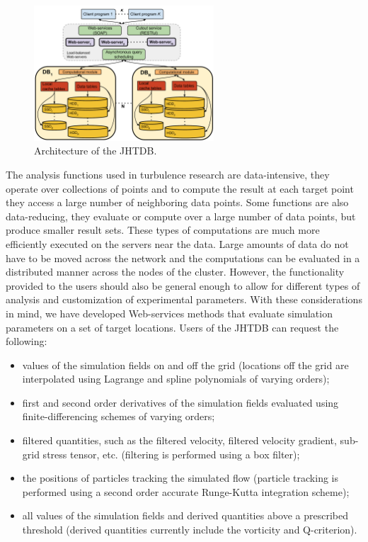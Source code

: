 \documentclass[10pt,twocolumn]{article}
\begin{document}
\begin{figure}
\includegraphics[width=0.6\textwidth]{jhtdb_diagram.pdf}
\caption{Architecture of the JHTDB.}
\label{fig:architecture}
\end{figure}

The analysis functions used in turbulence research are data-intensive, they operate over collections of points and to compute the result at each target point
they access a large number of neighboring data points. Some functions are also data-reducing, they evaluate or compute over a large number of data
points, but produce smaller result sets. These types of computations are much more efficiently executed on the servers near the data. Large amounts of data
do not have to be moved across the network and the computations can be evaluated in a distributed manner across the nodes of the cluster. However, the
functionality provided to the users should also be general enough to allow for different types of analysis and customization of experimental parameters.
With these considerations in mind, we have developed Web-services methods that evaluate simulation parameters on a set of target locations. Users of 
the JHTDB can request the following:
\begin{itemize}
\item values of the simulation fields on and off the grid (locations off the grid are interpolated using Lagrange and spline polynomials of varying orders);
\item first and second order derivatives of the simulation fields evaluated using finite-differencing schemes of varying orders;
\item filtered quantities, such as the filtered velocity, filtered velocity gradient, sub-grid stress tensor, etc. (filtering is performed using a box filter);
\item the positions of particles tracking the simulated flow (particle tracking is performed using a second order accurate Runge-Kutta integration scheme);
\item all values of the simulation fields and derived quantities above a prescribed threshold (derived quantities currently include the vorticity and Q-criterion).
\end{itemize}
\end{document}
